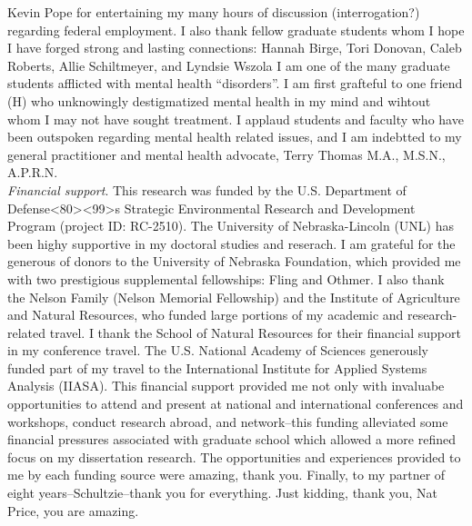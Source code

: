 \documentclass[12pt,twoside,openany]{reedthesis}
\begin{document}
\begin{acknowledgements}
    Kevin Pope for entertaining my many hours of discussion (interrogation?)
    regarding federal employment. I also thank fellow graduate students whom
    I hope I have forged strong and lasting connections: Hannah Birge, Tori
    Donovan, Caleb Roberts, Allie Schiltmeyer, and Lyndsie Wszola I am one
    of the many graduate students afflicted with mental health
    ``disorders''. I am first grafteful to one friend (H) who unknowingly
    destigmatized mental health in my mind and wihtout whom I may not have
    sought treatment. I applaud students and faculty who have been outspoken
    regarding mental health related issues, and I am indebtted to my general
    practitioner and mental health advocate, Terry Thomas M.A., M.S.N.,
    A.P.R.N.\\
    \emph{Financial support}. This research was funded by the U.S.
    Department of
    Defense\textless{}80\textgreater{}\textless{}99\textgreater{}s Strategic
    Environmental Research and Development Program (project ID: RC-2510).
    The University of Nebraska-Lincoln (UNL) has been highy supportive in my
    doctoral studies and reserach. I am grateful for the generous of donors
    to the University of Nebraska Foundation, which provided me with two
    prestigious supplemental fellowships: Fling and Othmer. I also thank the
    Nelson Family (Nelson Memorial Fellowship) and the Institute of
    Agriculture and Natural Resources, who funded large portions of my
    academic and research-related travel. I thank the School of Natural
    Resources for their financial support in my conference travel. The U.S.
    National Academy of Sciences generously funded part of my travel to the
    International Institute for Applied Systems Analysis (IIASA). This
    financial support provided me not only with invaluabe opportunities to
    attend and present at national and international conferences and
    workshops, conduct research abroad, and network--this funding alleviated
    some financial pressures associated with graduate school which allowed a
    more refined focus on my dissertation research. The opportunities and
    experiences provided to me by each funding source were amazing, thank
    you. Finally, to my partner of eight years--Schultzie--thank you for
    everything. Just kidding, thank you, Nat Price, you are amazing.
  \end{acknowledgements}

  \hypersetup{linkcolor=black}
  \setcounter{tocdepth}{2}
  \tableofcontents

  \listoftables
\end{document}
